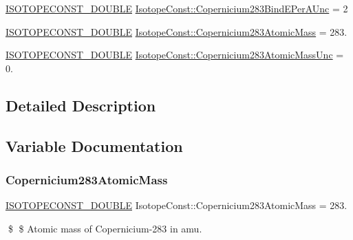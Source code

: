 \begin{DoxyCompactItemize}
\item 
\mbox{\hyperlink{group___isotope_const-_macros_ga8f45a7272ce02c0b4c65c44636ed719a}{I\+S\+O\+T\+O\+P\+E\+C\+O\+N\+S\+T\+\_\+\+D\+O\+U\+B\+LE}} \mbox{\hyperlink{group___isotope_const-_copernicium-_cn283_gaf11e445748ea03815c297799d4cf5ee0}{Isotope\+Const\+::\+Copernicium283\+Bind\+E\+Per\+A\+Unc}} = 2
\item 
\mbox{\hyperlink{group___isotope_const-_macros_ga8f45a7272ce02c0b4c65c44636ed719a}{I\+S\+O\+T\+O\+P\+E\+C\+O\+N\+S\+T\+\_\+\+D\+O\+U\+B\+LE}} \mbox{\hyperlink{group___isotope_const-_copernicium-_cn283_ga915927a89bfa1e3be7027832cc1b2561}{Isotope\+Const\+::\+Copernicium283\+Atomic\+Mass}} = 283.
\item 
\mbox{\hyperlink{group___isotope_const-_macros_ga8f45a7272ce02c0b4c65c44636ed719a}{I\+S\+O\+T\+O\+P\+E\+C\+O\+N\+S\+T\+\_\+\+D\+O\+U\+B\+LE}} \mbox{\hyperlink{group___isotope_const-_copernicium-_cn283_ga2528a9b6e87ee0842150523aa0558181}{Isotope\+Const\+::\+Copernicium283\+Atomic\+Mass\+Unc}} = 0.
\end{DoxyCompactItemize}


\subsection{Detailed Description}


\subsection{Variable Documentation}
\mbox{\label{group___isotope_const-_copernicium-_cn283_ga915927a89bfa1e3be7027832cc1b2561}} 
\subsubsection{\texorpdfstring{Copernicium283\+Atomic\+Mass}{Copernicium283AtomicMass}}
{\footnotesize\ttfamily \mbox{\hyperlink{group___isotope_const-_macros_ga8f45a7272ce02c0b4c65c44636ed719a}{I\+S\+O\+T\+O\+P\+E\+C\+O\+N\+S\+T\+\_\+\+D\+O\+U\+B\+LE}} Isotope\+Const\+::\+Copernicium283\+Atomic\+Mass = 283.}

\$ \$ Atomic mass of Copernicium-\/283 in amu. \mbox{\label{group___isotope_const-_copernicium-_cn283_ga2528a9b6e87ee0842150523aa0558181}} 
